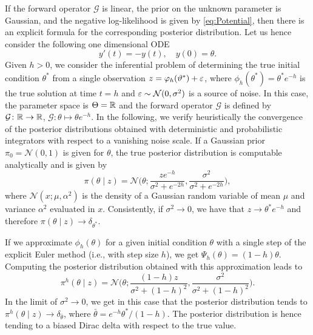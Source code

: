 \documentclass[10pt]{article}
\begin{document}
If the forward operator $\mathcal{G}$ is linear, the prior on the unknown parameter is Gaussian, and the negative log-likelihood is given by \eqref{eq:Potential}, then there is an explicit formula for the corresponding posterior distribution. Let us hence consider the following one dimensional ODE
\begin{equation}
	y'(t) = -y(t), \quad y(0) = \theta.
\end{equation}
Given $h > 0$, we consider the inferential problem of determining the true initial condition $\theta^*$ from a single observation $z = \varphi_h(\vartheta^*) + \varepsilon$, where $\phi_h(\theta^*) = \theta^*e^{-h}$ is the true solution at time $t =  h$ and $\varepsilon \sim \mathcal N (0, \sigma^2)$ is a source of noise. In this case, the parameter space is $\Theta = \mathbb{R}$ and the forward operator $\mathcal G$ is defined by $\mathcal G\colon \mathbb{R} \to \mathbb{R}$, $\mathcal G \colon \theta \mapsto \theta e^{-h}$. In the following, we verify heuristically the convergence of the posterior distributions obtained with deterministic and probabilistic integrators with respect to a vanishing noise scale. If a Gaussian prior $\pi_0 = \mathcal N(0, 1)$ is given for $\theta$, the true posterior distribution is computable analytically and is given by
\begin{equation}\label{eq:ExPosteriorEx}
	\pi(\theta \mid z) = \mathcal N\Big(\theta; \frac{ze^{-h}}{\sigma^2 + e^{-2h}}, \frac{\sigma^2}{\sigma^2 + e^{-2h}}\Big),
\end{equation}
where $\mathcal N(x; \mu, \alpha^2)$ is the density of a Gaussian random variable of mean $\mu$ and variance $\alpha^2$ evaluated in $x$. Consistently, if $\sigma^2 \to 0$, we have that $z \to \theta^*e^{-h}$ and therefore $\pi(\theta \mid z) \to \delta_{\theta^*}$. 

If we approximate $\phi_h(\theta)$ for a given initial condition $\theta$ with a single step of the explicit Euler method (i.e., with step size $h$), we get $\Psi_h(\theta) = (1 - h)\theta$. Computing the posterior distribution obtained with this approximation leads to 
\begin{equation}\label{eq:ExPosteriorRK}
\pi^h(\theta \mid z) = \mathcal N\Big(\theta; \frac{(1 - h)z}{\sigma^2 + (1- h)^2}, \frac{\sigma^2}{\sigma^2 + (1 - h)^2}\Big).
\end{equation}
In the limit of $\sigma^2 \to 0$, we get in this case that the posterior distribution tends to $\pi^h(\theta \mid z) \to \delta_{\bar \theta}$, where $\bar \theta = e^{-h}\theta^* / (1 - h)$. The posterior distribution is hence tending to a biased Dirac delta with respect to the true value.
\end{document}
